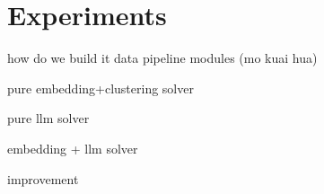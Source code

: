 \chapter{Experiments}


how do we build it
data
pipeline
modules (mo kuai hua)

pure embedding+clustering solver


pure llm solver


embedding + llm solver

improvement


